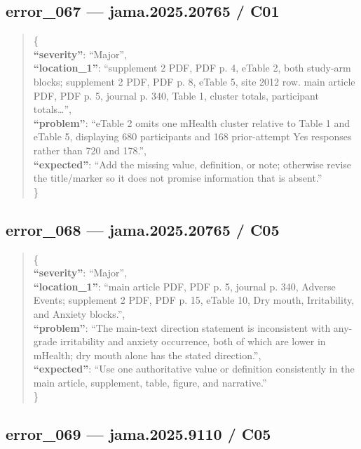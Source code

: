 \documentclass[
  letterpaper,
  9pt]{extreport}
\begin{document}
\hypertarget{error_067--jama202520765--c01}{%
\subsection{error\_067 --- jama.2025.20765 /
C01}\label{error_067--jama202520765--c01}}

\begin{quote}
\{\\
\textbf{``severity''}: ``Major'',\\
\textbf{``location\_1''}: ``supplement 2 PDF, PDF p. 4, eTable 2, both
study-arm blocks; supplement 2 PDF, PDF p. 8, eTable 5, site 2012 row.
main article PDF, PDF p. 5, journal p. 340, Table 1, cluster totals,
participant totals\ldots{}'',\\
\textbf{``problem''}: ``eTable 2 omits one mHealth cluster relative to
Table 1 and eTable 5, displaying 680 participants and 168 prior-attempt
Yes responses rather than 720 and 178.'',\\
\textbf{``expected''}: ``Add the missing value, definition, or note;
otherwise revise the title/marker so it does not promise information
that is absent.''\\
\}
\end{quote}

\hypertarget{error_068--jama202520765--c05}{%
\subsection{error\_068 --- jama.2025.20765 /
C05}\label{error_068--jama202520765--c05}}

\begin{quote}
\{\\
\textbf{``severity''}: ``Major'',\\
\textbf{``location\_1''}: ``main article PDF, PDF p. 5, journal p. 340,
Adverse Events; supplement 2 PDF, PDF p. 15, eTable 10, Dry mouth,
Irritability, and Anxiety blocks.'',\\
\textbf{``problem''}: ``The main-text direction statement is
inconsistent with any-grade irritability and anxiety occurrence, both of
which are lower in mHealth; dry mouth alone has the stated
direction.'',\\
\textbf{``expected''}: ``Use one authoritative value or definition
consistently in the main article, supplement, table, figure, and
narrative.''\\
\}
\end{quote}

\hypertarget{error_069--jama20259110--c05}{%
\subsection{error\_069 --- jama.2025.9110 /
C05}\label{error_069--jama20259110--c05}}
\end{document}

